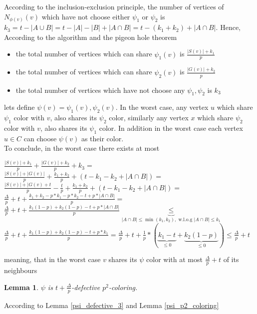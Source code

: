\documentclass[11pt]{article}
\newtheorem{lemma}[theorem]{Lemma}
\begin{document}
According to the inclusion-exclusion principle, the number of vertices of $N_{\phi(v)}(v)$ which have not choose either $\psi_1$ or $\psi_2$ is $k_3 = t - |A \cup B| = t - |A| - |B| + |A \cap B| = t - (k_1 + k_2) + |A \cap B|$.
Hence, According to the algorithm and the pigeon hole theorem
\begin{itemize}
    \item the total number of vertices which can share $\psi_1(v)$ is $\frac{|S(v)| + k_1}{p}$
    \item the total number of vertices which can share $\psi_2(v)$ is $\frac{|G(v)| + k_2}{p}$
    \item the total number of vertices which have not choose any $\psi_1, \psi_2$ is $k_3$
\end{itemize}
lets define $\psi(v) = \psi_1(v), \psi_2(v)$. In the worst case, any vertex $u$ which share $\psi_1$ color with $v$, also shares its $\psi_2$ color, similarly any vertex $x$ which share $\psi_2$ color with $v$, also shares its $\psi_1$ color. In addition in the worst case each vertex $u \in C$ can choose $\psi(v)$ as their color. \\
To conclude, in the worst case there exists at most 
\begin{doublespacing}
\newline
$\frac{|S(v)| + k_1}{p} + \frac{|G(v)| + k_2}{p} + k_3 =$
\\[5mm]
$\frac{|S(v)| + |G(v)|}{p} + \frac{k_1 + k_2}{p} + (t - k_1 - k_2 +  |A \cap B|) =$ 
\\[5mm] 
$\frac{|S(v)| + |G(v) +t }{p} - \frac{t}{p} + \frac{k_1 + k_2}{p} + (t - k_1 - k_2 +  |A \cap B|) =$
\\[5mm]
$\frac{\Delta}{p} + t + \frac{k_1 + k_2 - p*k_1 - p*k_2 - t + p * |A \cap B|}{p}  = $
\\[5mm]
$\frac{\Delta}{p} + t + \frac{k_1(1-p) + k_2(1-p) - t + p * |A \cap B|}{p} \underbrace{\le}_{|A \cap B| \le \min({k_1, k_2}), \text{ w.l.o.g } |A \cap B| \le k_1}$
\\[5mm]  
$\frac{\Delta}{p} + t + \frac{k_1(1-p) + k_2(1-p) - t + p * k_1}{p} =  \frac{\Delta}{p} + t + \frac{1}{p}*(\underbrace{k_1 - t}_{\le 0} + \underbrace{k_2(1-p)}_{\le 0}) \le  \boxed{\frac{\Delta}{p} + t}$
\end{doublespacing}


meaning, that in the worst case $v$ shares its $\psi$ color with at most $\frac{\Delta}{p} + t$ of its neighbours


\begin{lemma}
$\psi$ is $t+\frac{\Delta}{p}$-defective $p^2$-coloring.
\end{lemma}
According to Lemma \ref{psi_defective_3} and Lemma \ref{psi_p2_coloring}
\end{document}
